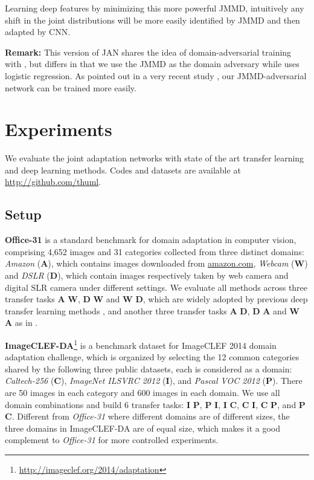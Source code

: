 \documentclass{article}
\begin{document}
Learning deep features by minimizing this more powerful JMMD, intuitively any shift in the joint distributions will be more easily identified by JMMD and then adapted by CNN.

\textbf{Remark:} This version of JAN shares the idea of domain-adversarial training with \cite{cite:ICML15RevGrad}, but differs in that we use the JMMD as the domain adversary while \cite{cite:ICML15RevGrad} uses logistic regression. As pointed out in a very recent study \cite{cite:Arxiv17WGAN}, our JMMD-adversarial network can be trained more easily.

\section{Experiments}
We evaluate the joint adaptation networks with state of the art transfer learning and deep learning methods. Codes and datasets are available at \url{http://github.com/thuml}.

\subsection{Setup}
\textbf{Office-31} \cite{cite:ECCV10Office} is a standard benchmark for domain adaptation in computer vision, comprising 4,652 images and 31 categories collected from three distinct domains: \textit{Amazon} (\textbf{A}), which contains images downloaded from \url{amazon.com}, \textit{Webcam} (\textbf{W}) and \textit{DSLR} (\textbf{D}), which contain images respectively taken by web camera and digital SLR camera under different settings. We evaluate all methods across three transfer tasks \textbf{A}  \textbf{W}, \textbf{D}  \textbf{W} and \textbf{W}  \textbf{D}, which are widely adopted by previous deep transfer learning methods \cite{cite:Arxiv14DDC,cite:ICML15RevGrad}, and another three transfer tasks \textbf{A}  \textbf{D}, \textbf{D}  \textbf{A} and \textbf{W}  \textbf{A} as in \cite{cite:ICML15DAN,cite:NIPS16RTN,cite:ICCV15SDT}.

\textbf{ImageCLEF-DA}\footnote{\url{http://imageclef.org/2014/adaptation}} is a benchmark dataset for ImageCLEF 2014 domain adaptation challenge, which is organized by selecting the 12 common categories shared by the following three public datasets, each is considered as a domain: \textit{Caltech-256} (\textbf{C}), \textit{ImageNet ILSVRC 2012} (\textbf{I}), and \textit{Pascal VOC 2012} (\textbf{P}). 
There are 50 images in each category and 600 images in each domain. We use all domain combinations and build 6 transfer tasks: \textbf{I}  \textbf{P}, \textbf{P}  \textbf{I}, \textbf{I}  \textbf{C}, \textbf{C}  \textbf{I}, \textbf{C}  \textbf{P}, and \textbf{P}  \textbf{C}. Different from \emph{Office-31} where different domains are of different sizes, the three domains in ImageCLEF-DA are of equal size, which makes it a good complement to  \textit{Office-31} for more controlled experiments.
\end{document}
